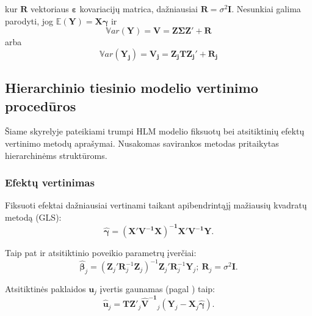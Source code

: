 \documentclass[12pt,a4paper]{article}
\begin{document}
kur $\mathbf{R}$ vektoriaus $\boldsymbol{\varepsilon}$ kovariacijų matrica, dažniausiai $\mathbf{R}=\sigma^2\mathbf{I}$. Nesunkiai galima parodyti, jog $\mathbb{E}(\mathbf{Y})=\mathbf{X}\boldsymbol{\gamma}$ ir
\begin{equation} \label{eq:var}
\mathbb{V}ar(\mathbf{Y})=\mathbf{V}=\mathbf{Z\Sigma Z}'+\mathbf{R}
\end{equation}
arba
\begin{equation} \label{eq:varj}
\mathbb{V}ar(\mathbf{Y_j})=\mathbf{V_j}=\mathbf{Z_jTZ_j}'+\mathbf{R_j}
\end{equation}

\subsection{Hierarchinio tiesinio modelio vertinimo procedūros}
\indent Šiame skyrelyje pateikiami trumpi HLM modelio fiksuotų bei atsitiktinių efektų vertinimo metodų aprašymai. Nusakomas savirankos metodas pritaikytas hierarchinėms struktūroms.
\subsubsection{Efektų vertinimas}
\indent Fiksuoti efektai dažniausiai vertinami taikant apibendrintąjį mažiausių kvadratų metodą (GLS):
\begin{equation}\label{eq:gamma}
\boldsymbol{\hat{\gamma}}=\mathbf{\left(X'V^{-1}X\right)^{-1}X'V^{-1}Y}.
\end{equation}

Taip pat ir atsitiktinio poveikio parametrų įverčiai:
\begin{equation} \label{eq:beta}
\boldsymbol{\hat{\beta}}_j=\left(\mathbf{Z}_j'\mathbf{R}^{-1}_j\mathbf{Z}_j\right)^{-1}\mathbf{Z}_j'\mathbf{R}^{-1}_j\mathbf{Y}_j;\ \mathbf{R}_j=\sigma^2\mathbf{I}.
\end{equation}

Atsitiktinės paklaidos $\mathbf{u}_j$ įvertis gaunamas (pagal \cite{EBi}) taip:
\begin{equation}
\mathbf{\hat{u}}_j=\mathbf{TZ}'_j\mathbf{\hat{V}^{-1}}_j\left(\mathbf{Y}_j-\mathbf{X}_j\boldsymbol{\hat{\gamma}}\right).
\end{equation}
\end{document}
